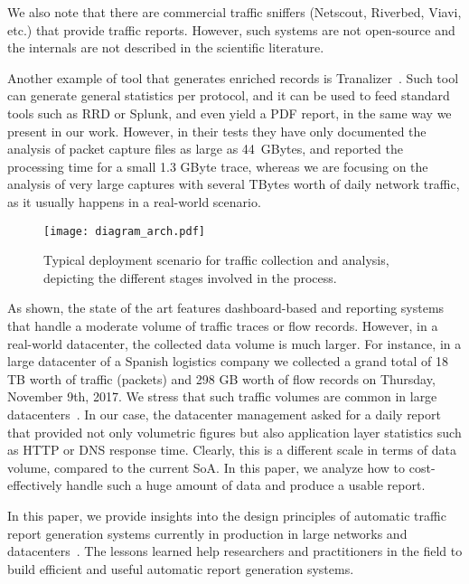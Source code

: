 \documentclass[AMA,STIX1COL]{WileyNJD-v2}
\begin{document}
We also note that there are commercial traffic sniffers (Netscout, Riverbed, Viavi, etc.) that provide traffic reports. However, such systems are not open-source and the internals are not described in the scientific literature.

Another example of tool that generates enriched records is \textsf{Tranalizer}~\cite{tranalizer}. Such tool can generate general statistics per protocol, and it can be used to feed standard tools such as RRD or Splunk, and even yield a PDF report, in the same way we present in our work. However, in their tests they have only documented the analysis of packet capture files as large as 44~GBytes, and reported the processing time for a small 1.3 GByte trace, whereas we are focusing on the analysis of very large captures with several TBytes worth of daily network traffic, as it usually happens in a real-world scenario.  %

\begin{figure*}[t!]
\centering
\texttt{[image: diagram\_arch.pdf]}
\caption{Typical deployment scenario for traffic collection and analysis, depicting the different stages involved in the process.}
\label{fig:arch}
\vspace{-1em}
\end{figure*}

As shown, the state of the art features dashboard-based and reporting systems that handle a moderate volume of traffic traces or flow records. However, in a real-world datacenter, the collected data volume is much larger. For instance, in a large datacenter of a Spanish logistics company we collected a grand total of 18 TB worth of traffic (packets) and 298 GB worth of flow records on Thursday, November 9th, 2017. We stress that such traffic volumes are common in large datacenters~\cite{CISCO}. In our case, the datacenter management asked for a daily report that provided not only volumetric figures but also application layer statistics such as HTTP or DNS response time. Clearly, this is a different scale in terms of data volume, compared to the current SoA. In this paper, we analyze how to cost-effectively handle such a huge amount of data and produce a usable report.  %

In this paper, we provide insights into the design principles of automatic traffic report generation systems currently in production in large networks and datacenters~\cite{fermin_web}. The lessons learned help researchers and practitioners in the field to build efficient and useful automatic report generation systems.
\end{document}
